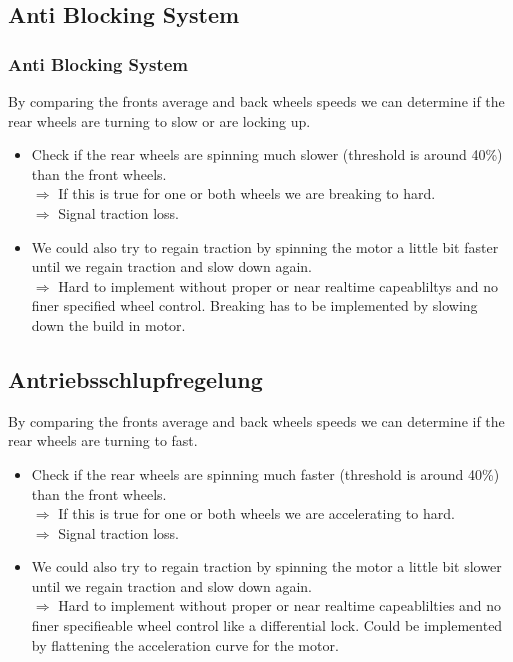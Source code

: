 \documentclass{beamer}
\begin{document}
\subsection{Anti Blocking System}
\begin{frame}
    \frametitle{Anti Blocking System}
    By comparing the fronts average and back wheels speeds we can determine if the rear wheels are turning to slow or are locking up. 
    \begin{itemize}
     \item Check if the rear wheels are spinning much slower (threshold is around 40\%) than the front wheels.\\
     $\Rightarrow$ If this is true for one or both wheels we are breaking to hard.\\
     $\Rightarrow$ Signal traction loss.
     \pause
     \item We could also try to regain traction by spinning the motor a little bit faster until we regain traction and slow down again.\\
     $\Rightarrow$ Hard to implement without proper or near realtime capeabliltys and no finer specified wheel control. Breaking has to be implemented by slowing down the build in motor. \\
     \pause
    \end{itemize}
\end{frame}
\subsection{Antriebsschlupfregelung}
\begin{frame}
    By comparing the fronts average and back wheels speeds we can determine if the rear wheels are turning to fast. 
    \begin{itemize}
     \item Check if the rear wheels are spinning much faster (threshold is around 40\%) than the front wheels.\\
     $\Rightarrow$ If this is true for one or both wheels we are accelerating to hard.\\
     $\Rightarrow$ Signal traction loss.
     \pause
     \item We could also try to regain traction by spinning the motor a little bit slower until we regain traction and slow down again.\\
     $\Rightarrow$ Hard to implement without proper or near realtime capeablilties and no finer specifieable wheel control like a differential lock. Could be implemented by flattening the acceleration curve for the motor. \\
     \pause
    \end{itemize}
\end{frame}
\end{document}
